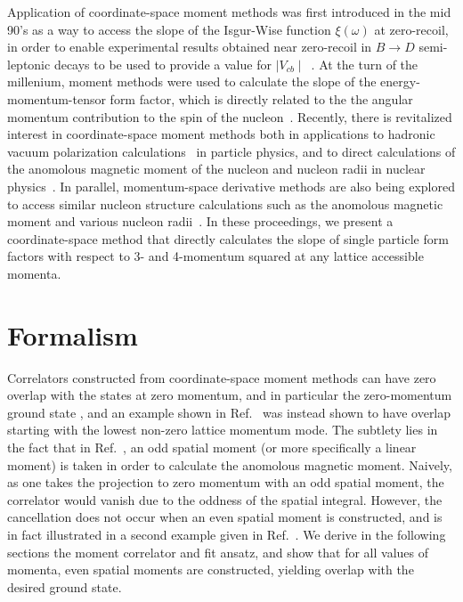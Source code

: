 \documentclass{PoS}
\newcommand{\dgr}[1]{\textcolor{David}{#1}}
\begin{document}
Application of coordinate-space moment methods was first introduced in
the mid 90's as a way to access the slope of the Isgur-Wise function
$\xi(\omega)$ at zero-recoil, in order to enable experimental results
obtained near zero-recoil in $B\rightarrow D$ semi-leptonic decays
\dgr{to be used to provide a value for $\mid V_{cb}\mid$}~\cite{Lellouch:1994zu}. At the turn of the millenium,
moment methods were used to calculate the slope of the
energy-momentum-tensor form factor, which is directly related to the
the angular momentum contribution to the spin of the
nucleon~\cite{Mathur:1999uf}\cite{Gadiyak:2001fe}. Recently, there is
revitalized interest in coordinate-space moment methods both in
applications to hadronic vacuum polarization
calculations~\cite{Chakraborty:2016mwy}\cite{Blum:2016xpd} in particle
physics, and to direct calculations of the anomolous magnetic moment of
the nucleon and nucleon radii in nuclear
physics~\cite{Alexandrou:2016rbj}. In parallel, momentum-space
derivative methods are also being explored to access similar nucleon
structure calculations such as the anomolous magnetic moment and
various nucleon radii~\cite{deDivitiis:2012vs}\cite{Tiburzi:2014yra}.
In these proceedings, we present a coordinate-space method that
directly calculates the slope of single particle form factors with
respect to 3- and 4-momentum squared at any lattice accessible
momenta.

\section{Formalism}
Correlators constructed from coordinate-space moment methods
\dgr{can have} zero overlap with the \dgr{states at zero momentum, and in particular the zero-momentum ground state}
, and an example shown in
Ref.~\cite{Wilcox:2002zt} was instead shown to have overlap starting with the
lowest non-zero lattice momentum mode. The subtlety lies in the fact
that in Ref.~\cite{Wilcox:2002zt}, an odd spatial moment (or more
specifically a linear moment) is taken in order to calculate the
anomolous magnetic moment. Naively, as one takes the projection to
zero momentum with an odd spatial moment, the correlator would vanish
due to the oddness of the spatial integral.  However, the cancellation
does not occur when an even spatial moment is constructed, and is in
fact \dgr{illustrated} in a second example given in
Ref.~\cite{Wilcox:2002zt}. We derive in the following sections the
moment correlator and fit ansatz, and show that for all values of
momenta, even spatial moments are constructed, yielding overlap with
the desired ground state.
\end{document}
